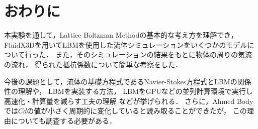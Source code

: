 \documentclass[main]{subfiles}
\begin{document}
\chapter{おわりに}
本実験を通して，Lattice Boltzman Methodの基本的な考え方を理解でき，
FluidX3Dを用いてLBMを使用した流体シミュレーションをいくつかのモデルについて行った．
また，そのシミュレーションの結果をもとに物体の周りの気流の流れ，
得られた抵抗係数について簡単な考察をした．

今後の課題として，流体の基礎方程式であるNavier-Stokes方程式とLBMの関係性の理解や，
LBMを実装する方法，
LBMをGPUなどの並列計算環境で実行し高速化・計算量を減らす工夫の理解
などが挙げられる．
さらに，Ahmed Bodyでは$Cd$の値が小さく周期的に変化していると読み取ることができたが，
この理由についても調査する必要がある．
\end{document}
